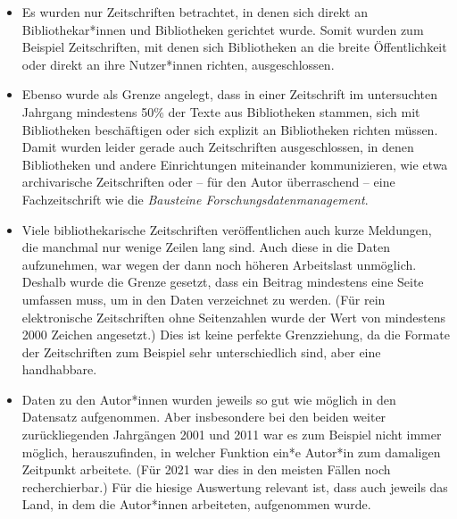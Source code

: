 \documentclass[a4paper,
fontsize=11pt,
oneside,
numbers=noperiodatend,
parskip=half-,
bibliography=totoc,
final
]{scrartcl}
\begin{document}
\begin{itemize}
\item
  Es wurden nur Zeitschriften betrachtet, in denen sich direkt an
  Bibliothekar*innen und Bibliotheken gerichtet wurde.
  Somit wurden  zum Beispiel Zeitschriften, mit denen sich
  Bibliotheken an die breite Öffentlichkeit oder direkt
  an ihre Nutzer*innen richten,  ausgeschlossen.
\item
  Ebenso wurde als Grenze angelegt, dass in einer Zeitschrift im
  untersuchten Jahrgang mindestens 50\% der Texte aus
  Bibliotheken stammen, sich mit Bibliotheken
  beschäftigen oder sich explizit an Bibliotheken richten
  müssen. Damit wurden leider gerade auch Zeitschriften
  ausgeschlossen, in denen Bibliotheken und andere 
  Einrichtungen miteinander kommunizieren, wie etwa archivarische
  Zeitschriften oder -- für den Autor überraschend --
  eine Fachzeitschrift wie die \emph{Bausteine
  Forschungsdatenmanagement}.
\item
  Viele bibliothekarische Zeitschriften veröffentlichen auch kurze
  Meldungen, die manchmal nur wenige Zeilen lang sind.
  Auch diese in die Daten aufzunehmen, war wegen der dann
  noch höheren Arbeitslast unmöglich. Deshalb wurde die
  Grenze gesetzt, dass ein Beitrag mindestens eine Seite
  umfassen muss, um in den Daten verzeichnet zu werden.
  (Für rein elektronische Zeitschriften ohne Seitenzahlen
  wurde der Wert von mindestens 2000 Zeichen angesetzt.) Dies ist
  keine perfekte Grenzziehung, da die Formate der
  Zeitschriften zum Beispiel sehr unterschiedlich sind,
  aber eine handhabbare.
\item
  Daten zu den Autor*innen wurden jeweils so gut wie möglich in den
  Datensatz aufgenommen. Aber insbesondere bei den beiden
  weiter zurückliegenden Jahrgängen 2001 und 2011 war es
  zum Beispiel nicht immer möglich, herauszufinden, in
  welcher Funktion ein*e Autor*in zum damaligen Zeitpunkt
  arbeitete. (Für 2021 war dies in den meisten Fällen
  noch recherchierbar.) Für die hiesige Auswertung
  relevant ist, dass auch jeweils das Land, in dem die
  Autor*innen arbeiteten, aufgenommen wurde.
\end{itemize}
\end{document}
